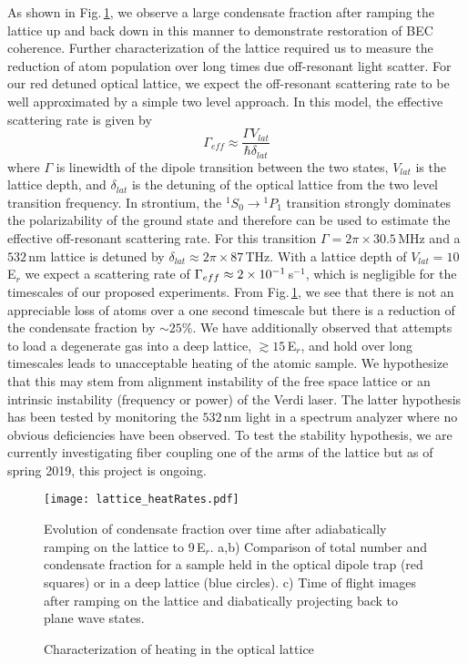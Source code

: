 As shown in Fig.\,\ref{fig:heatingRates}, we observe a large condensate fraction after ramping the lattice up and back down in this manner to demonstrate restoration of BEC coherence.
Further characterization of the lattice required us to measure the reduction of atom population over long times due off-resonant light scatter.
For our red detuned optical lattice, we expect the off-resonant scattering rate to be well approximated by a simple two level approach. 
In this model, the effective scattering rate is given by \cite{Jaksch2005}
	\begin{equation} \label{eq:offResScatter}
		\Gamma_{eff} \approx \frac{\Gamma V_{lat}}{\hbar \delta_{lat}}
	\end{equation}
where $\Gamma$ is linewidth of the dipole transition between the two states, $V_{lat}$ is the lattice depth, and $\delta_{lat}$ is the detuning of the optical lattice from the two level transition frequency.
In strontium, the $^1S_0\!\rightarrow\!^1P_1$ transition strongly dominates the polarizability of the ground state and therefore can be used to estimate the effective off-resonant scattering rate.
For this transition $\Gamma = 2 \pi \times 30.5\,$MHz and a $532$\,nm lattice is detuned by $\delta_{lat} \approx 2 \pi \times 87\,$THz.
With a lattice depth of $V_{lat}=10\,$E$_r$ we expect a scattering rate of $\Gamma_{eff} \approx 2\times 10^{-1}\,$s$^{-1}$, which is negligible for the timescales of our proposed experiments.
From Fig.\,\ref{fig:heatingRates}, we see that there is not an appreciable loss of atoms over a one second timescale but there is a reduction of the condensate fraction by $\sim\!25$\%.
We have additionally observed that attempts to load a degenerate gas into a deep lattice, $\gtrsim 15$\,E$_r$, and hold over long timescales leads to unacceptable heating of the atomic sample.
We hypothesize that this may stem from alignment instability of the free space lattice or an intrinsic instability (frequency or power) of the Verdi laser.
The latter hypothesis has been tested by monitoring the $532$\,nm light in a spectrum analyzer where no obvious deficiencies have been observed.
To test the stability hypothesis, we are currently investigating fiber coupling one of the arms of the lattice but as of spring 2019, this project is ongoing.
	\begin{figure}
	\centerline{
		\texttt{[image: lattice\_heatRates.pdf]}}
		\caption{Characterization of heating in the optical lattice}{Evolution of condensate fraction over time after adiabatically ramping on the lattice to 9\,E$_r$. a,b) Comparison of total number and condensate fraction for a sample held in the optical dipole trap (red squares) or in a deep lattice (blue circles). c) Time of flight images after ramping on the lattice and diabatically projecting back to plane wave states.}
		 \label{fig:heatingRates}
	\end{figure}


